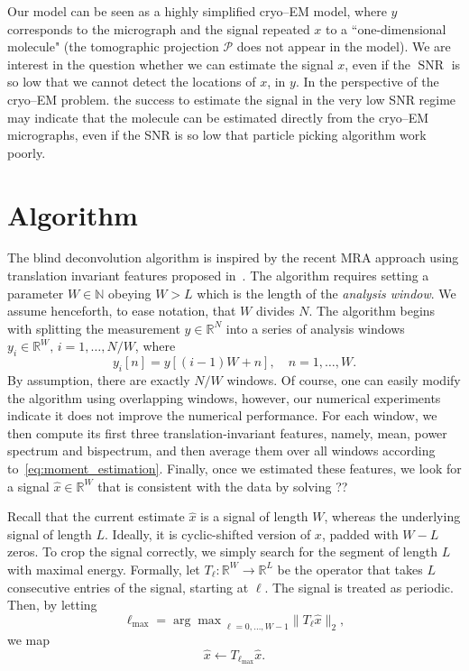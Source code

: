 \documentclass[journal]{IEEEtran}
\numberwithin{equation}{section}
\numberwithin{figure}{section}
\theoremstyle{plain}
\theoremstyle{definition}
\theoremstyle{remark}
\theoremstyle{plain}
\theoremstyle{remark}
\theoremstyle{plain}
\theoremstyle{plain}
\newcommand{\RL}{\mathbb{R}^L}
\newcommand{\RN}{\mathbb{R}^N}
\newcommand{\RW}{\mathbb{R}^W}
\newcommand{\SNR}{\operatorname{SNR}}
\begin{document}
 Our model can be seen as a highly simplified cryo--EM model, where $y$ corresponds to the micrograph and the signal repeated $x$ to a  ``one-dimensional molecule" (the tomographic projection $\mathcal{P}$ does not appear in the model). We are interest in the question whether we can estimate the signal $x$, even if the $\SNR$ is so low that we cannot detect the locations of $x$, in $y$. In the perspective of the cryo--EM problem. the success to estimate the signal in the very low SNR regime may indicate that the molecule can be estimated directly from the cryo--EM micrographs, even if the SNR is so low that particle picking algorithm work poorly. 



   

\section{Algorithm} \label{sec:algorithm}

The blind deconvolution algorithm is inspired by the recent MRA approach using translation invariant features proposed in~\cite{bendory2017bispectrum}. The algorithm requires setting a parameter $W\in\mathbb{N}$ obeying $W>L$  which is the length of the \emph{analysis window}. We assume henceforth, to ease notation, that $W$ divides $N$. 
The algorithm begins with splitting the measurement $y\in\RN$ into a series of analysis windows $y_i\in\mathbb{R}^W,\,i=1,\ldots,N/W$, where  
\begin{equation} \label{eq:analysis_window}
y_i[n] = y[(i-1)W + n] , \quad n=1,\ldots,W. 
\end{equation}
By assumption, there are exactly $N/W$ windows. Of course, one can easily modify the algorithm using overlapping windows, however, our numerical experiments indicate it does not improve the numerical performance.  For each window, we then compute its first three translation-invariant features, namely, mean, power spectrum and bispectrum, and then  average them over all windows according to~\eqref{eq:moment_estimation}. Finally, once we estimated these features, we look for a signal $\hat{x}\in\mathbb{R}^W$ that is consistent with the data by solving ??

Recall that the current estimate $\hat{x}$ is a signal of length $W$, whereas the underlying signal of length $L$.
Ideally, it is cyclic-shifted version of $x$, padded with $W-L$ zeros.
 To crop the signal correctly, we simply search for the  segment of length $L$ with maximal energy. Formally, let  $T_\ell:\RW\to\RL$ be the operator that takes $L$ consecutive entries of the signal, starting at $\ell$. The signal is treated as periodic.   
Then, by letting
\begin{equation}
\ell_{\max} =  {\arg\max}_{\ell=0,\ldots,W-1} \|T_\ell\hat{x} \|_2,
\end{equation}
we map
\begin{equation} \label{eq:align}
\hat{x}\gets T_{\ell_{\max}}\hat{x}.
\end{equation}
\end{document}
